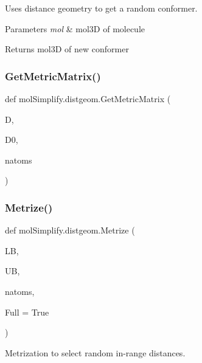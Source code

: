 Uses distance geometry to get a random conformer. 


\begin{DoxyParams}{Parameters}
{\em mol} & mol3D of molecule \\
\hline
\end{DoxyParams}
\begin{DoxyReturn}{Returns}
mol3D of new conformer 
\end{DoxyReturn}
\mbox{\label{namespacemolSimplify_1_1distgeom_a6d508087b38951d64ecc00438d3139d3}} 
\subsubsection{\texorpdfstring{Get\+Metric\+Matrix()}{GetMetricMatrix()}}
{\footnotesize\ttfamily def mol\+Simplify.\+distgeom.\+Get\+Metric\+Matrix (\begin{DoxyParamCaption}\item[{}]{D,  }\item[{}]{D0,  }\item[{}]{natoms }\end{DoxyParamCaption})}

\mbox{\label{namespacemolSimplify_1_1distgeom_aeea656ddbab4cd45d9229cf937cc5166}} 
\subsubsection{\texorpdfstring{Metrize()}{Metrize()}}
{\footnotesize\ttfamily def mol\+Simplify.\+distgeom.\+Metrize (\begin{DoxyParamCaption}\item[{}]{LB,  }\item[{}]{UB,  }\item[{}]{natoms,  }\item[{}]{Full = {\ttfamily True} }\end{DoxyParamCaption})}



Metrization to select random in-\/range distances. 

